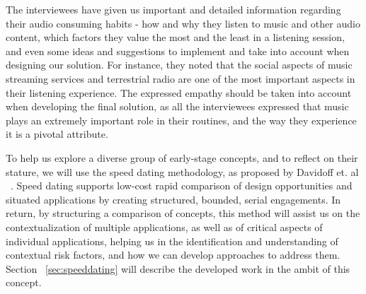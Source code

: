 The interviewees have given us important and detailed information regarding their audio consuming habits - how and why they listen to music and other audio content, which factors they value the most and the least in a listening session, and even some ideas and suggestions to implement and take into account when designing our solution. For instance, they noted that the social aspects of music streaming services and terrestrial radio are one of the most important aspects in their listening experience. The expressed empathy should be taken into account when developing the final solution, as all the interviewees expressed that music plays an extremely important role in their routines, and the way they experience it is a pivotal attribute.

To help us explore a diverse group of early-stage concepts, and to reflect on their stature, we will use the speed dating methodology, as proposed by Davidoff et. al ~\cite{Davidoff2007}. Speed dating supports low-cost rapid comparison of design opportunities and situated applications by creating structured, bounded, serial engagements. In return, by structuring a comparison of concepts, this method will assist us on the contextualization of multiple applications, as well as of critical aspects of individual applications, helping us in the identification and understanding of contextual risk factors, and how we can develop approaches to address them. Section ~\ref{sec:speeddating} will describe the developed work in the ambit of this concept.